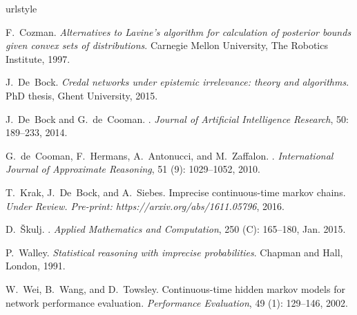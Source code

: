 \documentclass[twoside,11pt]{article}
\begin{document}
\vspace{-4pt}
%
\begin{thebibliography}{8}
\providecommand{\natexlab}[1]{#1}
\providecommand{\url}[1]{\texttt{#1}}
\expandafter\ifx\csname urlstyle\endcsname\relax
  \providecommand{\doi}[1]{doi: #1}\else
  \providecommand{\doi}{doi: \begingroup \urlstyle{rm}\Url}\fi

F.~Cozman.
\newblock \emph{Alternatives to Lavine's algorithm for calculation of posterior
  bounds given convex sets of distributions}.
\newblock Carnegie Mellon University, The Robotics Institute, 1997.

J.~De~Bock.
\newblock \emph{Credal networks under epistemic irrelevance: theory and
  algorithms}.
\newblock PhD thesis, Ghent University, 2015.

J.~De~Bock and G.~de~Cooman.
.
\newblock \emph{Journal of Artificial Intelligence Research}, 50:
  189--233, 2014.

G.~de~Cooman, F.~Hermans, A.~Antonucci, and M.~Zaffalon.
.
\newblock \emph{International Journal of Approximate Reasoning}, 51
  (9): 1029--1052, 2010.

T.~Krak, J.~De~Bock, and A.~Siebes.
\newblock Imprecise continuous-time markov chains.
\newblock \emph{Under Review. Pre-print: https://arxiv.org/abs/1611.05796},
  2016.

D.~{\v{S}}kulj.
.
\newblock \emph{Applied Mathematics and Computation}, 250
  (C): 165--180, Jan. 2015.

P.~Walley.
\newblock \emph{{Statistical reasoning with imprecise probabilities}}.
\newblock Chapman and Hall, London, 1991.

W.~Wei, B.~Wang, and D.~Towsley.
\newblock Continuous-time hidden markov models for network performance
  evaluation.
\newblock \emph{Performance Evaluation}, 49 (1): 129--146,
  2002.

\end{thebibliography}
\end{document}
